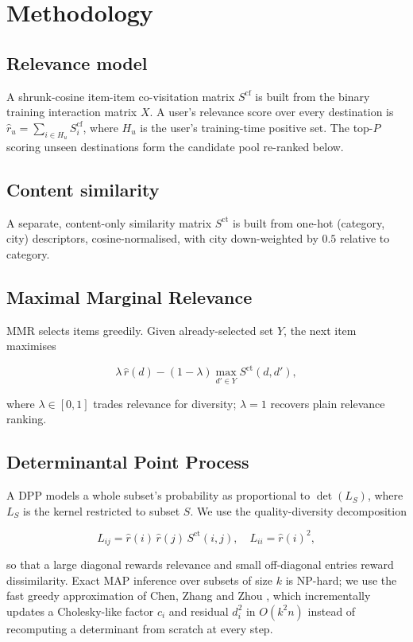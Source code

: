 \section{Methodology}

\subsection{Relevance model}
A shrunk-cosine item-item co-visitation matrix $S^{\text{cf}}$ is built from
the binary training interaction matrix $X$. A user's relevance score over
every destination is $\hat{r}_u = \sum_{i \in H_u} S^{\text{cf}}_i$, where
$H_u$ is the user's training-time positive set. The top-$P$ scoring unseen
destinations form the candidate pool re-ranked below.

\subsection{Content similarity}
A separate, content-only similarity matrix $S^{\text{ct}}$ is built from
one-hot (category, city) descriptors, cosine-normalised, with city
down-weighted by $0.5$ relative to category.

\subsection{Maximal Marginal Relevance}
MMR selects items greedily. Given already-selected set $Y$, the next item
maximises

\begin{equation}
  \lambda \, \hat{r}(d) - (1-\lambda) \max_{d' \in Y} S^{\text{ct}}(d, d'),
  \label{eq:mmr}
\end{equation}

where $\lambda \in [0,1]$ trades relevance for diversity; $\lambda=1$
recovers plain relevance ranking.

\subsection{Determinantal Point Process}
A DPP models a whole subset's probability as proportional to
$\det(L_S)$, where $L_S$ is the kernel restricted to subset $S$. We use the
quality-diversity decomposition

\begin{equation}
  L_{ij} = \hat{r}(i)\, \hat{r}(j)\, S^{\text{ct}}(i, j), \quad L_{ii} = \hat{r}(i)^2,
  \label{eq:dpp-kernel}
\end{equation}

so that a large diagonal rewards relevance and small off-diagonal entries
reward dissimilarity. Exact MAP inference over subsets of size $k$ is
NP-hard; we use the fast greedy approximation of Chen, Zhang and Zhou
\cite{chen2018fastgreedy}, which incrementally updates a Cholesky-like
factor $c_i$ and residual $d_i^2$ in $O(k^2 n)$ instead of recomputing a
determinant from scratch at every step.
